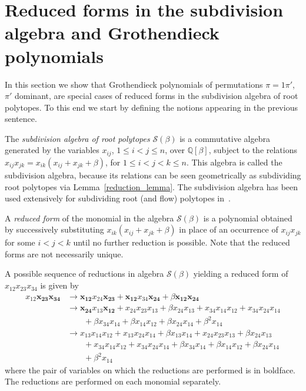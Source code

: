 \documentclass[10pt]{amsart}
\theoremstyle{definition}
\numberwithin{equation}{section}
\renewcommand*\t{{\mathcal{S}(\beta)}}
\newcommand*\+{\smash{\lower2pt\hbox{\rlap{\vrule height14pt}}\raise2pt\hbox{\rlap{\hskip-3pt \vrule height.4pt depth0pt width14.7pt}}}}
\begin{document}
\section{Reduced forms in the subdivision algebra and Grothendieck polynomials}\label{sec:groth}

In this section we show that Grothendieck polynomials of permutations $\pi=1\pi'$, $\pi'$ dominant, are special cases of reduced forms in the subdivision algebra of root polytopes. To this end we start by defining the notions appearing in the previous sentence.

The \emph{subdivision algebra of root polytopes} $\t$ is a commutative algebra generated by the variables $x_{ij}$, $1\leq i<j\leq n$, over $\mathbb{Q}[\beta]$, subject to the relations $x_{ij} x_{jk}=x_{ik}(x_{ij}+x_{jk}+\beta)$, for $1\leq i<j<k\leq n$. This algebra is called the subdivision algebra, because its relations can be seen geometrically as subdividing root polytopes via Lemma~\ref{reduction_lemma}. The subdivision algebra has been used extensively for subdividing root (and flow) polytopes in~\cite{root1, root2, h-poly1, prod, h-poly2, groth, mm}.

A \emph{reduced form} of the monomial in the algebra $\t$ is a polynomial obtained by successively substituting $x_{ik}(x_{ij}+x_{jk}+\beta)$ in place of an occurrence of $x_{ij} x_{jk}$ for some $i<j<k$ until no further reduction is possible. Note that the reduced forms are not necessarily unique.

A possible sequence of reductions in algebra $\t$ yielding a reduced form of $x_{12}x_{23}x_{34}$ is given by
\begin{equation}
\begin{aligned}\label{ex1}
x_{12} \boldsymbol{x_{23}x_{34}} & \rightarrow \boldsymbol{x_{12}}x_{24}\boldsymbol{x_{23}}+\boldsymbol{x_{12}}x_{34}\boldsymbol{x_{24}}+\beta \boldsymbol{x_{12}x_{24}}  \\
& \rightarrow  \boldsymbol{x_{24}} x_{13} \boldsymbol{x_{12}}+x_{24}x_{23}x_{13}+ \beta x_{24}x_{13}+x_{34}x_{14}x_{12}+x_{34}x_{24}x_{14}  \\
& \qquad+\beta x_{34}x_{14}+\beta x_{14}x_{12}+\beta x_{24}x_{14}+\beta^2 x_{14}  \\
& \rightarrow x_{13}x_{14}x_{12}+x_{13}x_{24}x_{14}+\beta x_{13}x_{14}+x_{24}x_{23}x_{13}+\beta x_{24}x_{13} \\
& \qquad+x_{34}x_{14}x_{12}+x_{34}x_{24}x_{14}+\beta x_{34}x_{14}+\beta x_{14}x_{12}+\beta x_{24}x_{14} \\
& \qquad+\beta^2 x_{14}
\end{aligned}
\end{equation}
where the pair of variables on which the reductions are performed is in boldface. The reductions are performed on each monomial separately.
\end{document}
